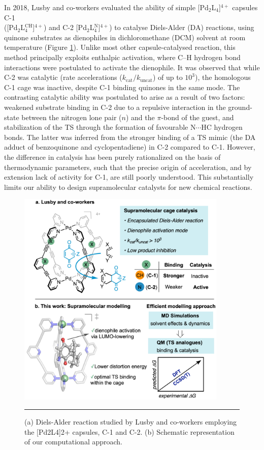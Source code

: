 \documentclass[../../main.tex]{subfiles}
\begin{document}
In 2018, Lusby and co-workers evaluated the ability of simple [Pd$_2$L$_4$]$^{4+}$ capsules C-1\\ ([Pd$_2$L$^{\text{CH}}_4$]$^{4+}$) and C-2 [Pd$_2$L$^{\text{N}}_4$]$^{4+}$) to catalyse Diels-Alder (DA) reactions, using quinone substrates as dienophiles in dichloromethane (DCM) solvent at room temperature (Figure \ref{fig::da_1}).\cite{MartCentelles2018} Unlike most other capsule-catalysed reaction, this method principally exploits enthalpic activation, where C–H hydrogen bond interactions were postulated to activate the dienophile. It was observed that while C-2 was catalytic (rate accelerations ($k_\text{cat}/k_\text{uncat}$) of up to $10^3$), the homologous C-1 cage was inactive, despite C-1 binding quinones in the same mode. The contrasting catalytic ability was postulated to arise as a result of two factors: weakened substrate binding in C-2 due to a repulsive interaction in the ground-state between the nitrogen lone pair ($n$) and the $\pi$-bond of the guest, and stabilization of the TS through the formation of favourable N$\cdots$HC hydrogen bonds. The latter was inferred from the stronger binding of a TS mimic (the DA adduct of benzoquinone and cyclopentadiene) in C-2 compared to C-1.\cite{MartCentelles2018} However, the difference in catalysis has been purely rationalized on the basis of thermodynamic parameters, such that the precise origin of acceleration, and by extension lack of activity for C-1, are still poorly understood. This substantially limits our ability to design supramolecular catalysts for new chemical reactions. 

\begin{figure}[h!]
	\vspace{0.4cm}
	\centering
	\includegraphics[width=10cm]{3/da//figs/fig1/fig1}
	\vspace{0.2cm}
	\hrule
	\caption{(a) Diels-Alder reaction studied by Lusby and co-workers employing the [Pd2L4]2+ capsules, C-1 and C-2. (b) Schematic representation of our computational approach.}
	\label{fig::da_1}
\end{figure}
\end{document}
